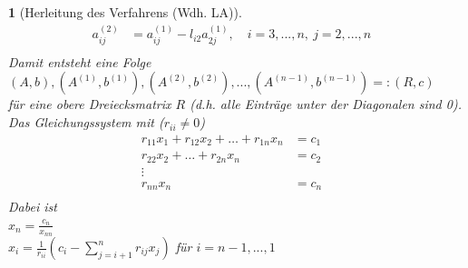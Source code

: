 \documentclass[12pt]{article}
\theoremstyle{break}
\newtheorem{nothing}[theorem]{}
\begin{document}
\begin{nothing}[Herleitung des Verfahrens (Wdh. LA)]
\begin{align*}
a_{ij}^{(2)} &= a_{ij}^{(1)} - l_{i2} a_{2j}^{(1)}, \quad i=3,...,n, \medspace j=2,...,n &\\
\end{align*}
%
Damit entsteht eine Folge\\ 
$(A, b), (A^{(1)}, b^{(1)}), (A^{(2)}, b^{(2)}),..., (A^{(n-1)}, b^{(n-1)}) =: (R,c)$\\
für eine obere Dreiecksmatrix $R$ (d.h. alle Einträge unter der Diagonalen sind 0).\\
Das Gleichungssystem mit ($r_{ii} \neq 0$)\\
%
\begin{align*}
r_{11}x_1 + r_{12}x_2 + \dots + r_{1n}x_n &= c_1 &\\
r_{22}x_2 + \dots + r_{2n}x_n &= c_2 &\\
\vdots& &\\
r_{nn}x_n &= c_{n} &\\
\end{align*}
%
Dabei ist\\
$x_n = \frac{c_n}{x_{nn}}$\\
$x_i = \frac{1}{r_{ii}}(c_i - \sum_{j=i+1}^n r_{ij}x_j)$ für $i=n-1,...,1$
\end{nothing}
\end{document}
